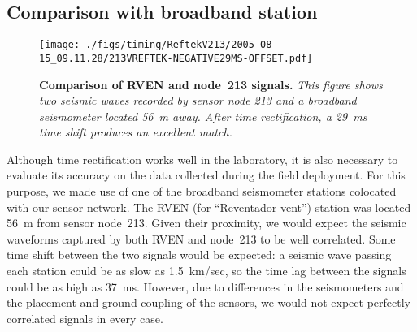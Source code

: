 

\subsection{Comparison with broadband station}
\label{sec-datagroundtruthing}

\begin{figure}[t]
\begin{center}
\texttt{[image: ./figs/timing/ReftekV213/2005-08-15\_09.11.28/213VREFTEK-NEGATIVE29MS-OFFSET.pdf]}
\end{center}
\caption{\small {\bf Comparison of RVEN and node~213 signals.} 
{\em This figure shows two seismic waves recorded by sensor node 213 and a
broadband seismometer located 56~m away. After time rectification, a 29~ms
time shift produces an excellent match.}}
\label{fig-rvenv213}
\end{figure}

Although time rectification works well in the laboratory, it is also
necessary to evaluate its accuracy on the data collected during the field
deployment. For this purpose, we made use of one of the broadband seismometer
stations colocated with our sensor network. The RVEN (for ``Reventador
vent'') station was located 56~m from sensor node~213.  
Given their proximity, we would expect
the seismic waveforms captured by both RVEN and node~213 to be
well correlated.  Some time shift between the two signals would be expected:
a seismic wave passing each station could be as slow as 1.5~km/sec, so
the time lag between the signals could be as high as 37~ms.  However, due to
differences in the seismometers and the placement and ground coupling of the
sensors, we would not expect perfectly correlated signals in every
case.


